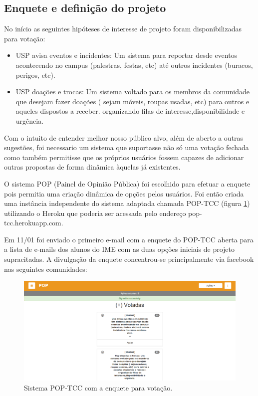 \subsection{Enquete e definição do projeto}
        \par  No início as seguintes hipóteses de interesse de projeto foram disponibilizadas para votação:
                \begin{itemize}
                \item {USP avisa eventos e incidentes:} Um sistema para reportar desde eventos acontecendo no campus (palestras, festas, etc) até outros incidentes (buracos, perigos, etc).
                \item {USP doações e trocas: } Um sistema voltado para os membros da comunidade que desejam fazer doações ( sejam móveis, roupas usadas, etc) para outros e aqueles dispostos a receber. organizando filas de interesse,disponibilidade e urgência.
                \end{itemize}
        \par Com o intuito de entender melhor nosso público alvo, além de aberto a outras sugestões, foi necessario um sistema que suportasse não só uma votação fechada como também permitisse que os próprios usuários fossem capazes de adicionar outras propostas de forma dinâmica àquelas já existentes.
        \par O sistema POP (Painel de Opinião Pública) foi escolhido para efetuar a enquete pois permitia uma criação dinâmica de opções pelos usuários. Foi então criada uma instância independente do sistema adaptada chamada POP-TCC (figura \ref{fig:pop-tcc}) utilizando o Heroku que poderia ser acessada pelo endereço pop-tcc.herokuapp.com.
        \par Em 11/01 foi enviado o primeiro e-mail com a enquete do POP-TCC aberta para a lista de e-mails dos alunos do IME com as duas opções iniciais de projeto supracitadas. A divulgação da enquete concentrou-se principalmente via facebook nas seguintes comunidades:
\begin{figure}[htb]
\includegraphics[width=15cm]{figuras/pop-tcc}
\caption{\label{fig:pop-tcc} Sistema POP-TCC com a enquete para votação.}
\end{figure}
